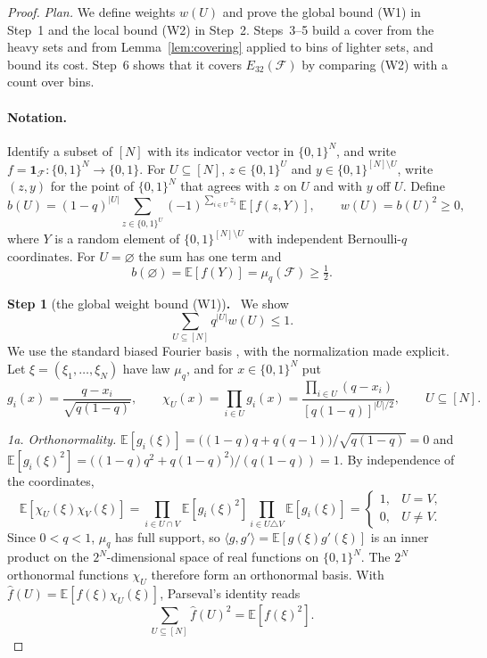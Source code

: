 \documentclass[11pt,letterpaper]{article}
\theoremstyle{definition}
\theoremstyle{remark}
\numberwithin{equation}{section}
\newcommand{\step}[2]{\medskip\noindent\textbf{Step #1} (#2)\textbf{.}\ }
\begin{document}
\begin{proof}
\emph{Plan.} We define weights $w(U)$ and prove the global bound (W1) in
Step~1 and the local bound (W2) in Step~2. Steps~3--5 build a cover from
the heavy sets and from Lemma~\ref{lem:covering} applied to bins of lighter
sets, and bound its cost. Step~6 shows that it covers
$E_{32}(\mathcal F)$ by comparing (W2) with a count over bins.

\paragraph{Notation.}
Identify a subset of $[N]$ with its indicator vector in $\{0,1\}^N$, and
write $f=\mathbf 1_{\mathcal F}:\{0,1\}^N\to\{0,1\}$. For
$U\subseteq[N]$, $z\in\{0,1\}^U$ and $y\in\{0,1\}^{[N]\setminus U}$, write
$(z,y)$ for the point of $\{0,1\}^N$ that agrees with $z$ on $U$ and with
$y$ off $U$. Define
\begin{equation}\label{eq:weights-definition}
 b(U)=(1-q)^{|U|}
 \sum_{z\in\{0,1\}^{U}}(-1)^{\sum_{i\in U}z_i}\,
 \mathbb E[f(z,Y)],
 \qquad w(U)=b(U)^2\ge0,
\end{equation}
where $Y$ is a random element of $\{0,1\}^{[N]\setminus U}$ with
independent Bernoulli-$q$ coordinates. For $U=\varnothing$ the sum has
one term and
\begin{equation}\label{eq:b-empty}
b(\varnothing)=\mathbb E[f(Y)]=\mu_q(\mathcal F)\ge\tfrac12 .
\end{equation}

\step{1}{the global weight bound \textup{(W1)}}
We show
\begin{equation}\label{eq:global-weight-bound}
 \sum_{U\subseteq[N]}q^{|U|}w(U)\le1 .
\end{equation}
We use the standard biased Fourier basis
\cite[Section~8.4]{ODonnell14}, with the normalization made explicit.
Let $\xi=(\xi_1,\ldots,\xi_N)$ have law $\mu_q$, and for $x\in\{0,1\}^N$
put
\[
 g_i(x)=\frac{q-x_i}{\sqrt{q(1-q)}},\qquad
 \chi_U(x)=\prod_{i\in U}g_i(x)
 =\frac{\prod_{i\in U}(q-x_i)}{[q(1-q)]^{|U|/2}},
 \qquad U\subseteq[N].
\]

\emph{1a. Orthonormality.}
$\mathbb E[g_i(\xi)]=\bigl((1-q)q+q(q-1)\bigr)/\sqrt{q(1-q)}=0$ and
$\mathbb E[g_i(\xi)^2]=\bigl((1-q)q^2+q(1-q)^2\bigr)/(q(1-q))=1$.
By independence of the coordinates,
\[
\mathbb E[\chi_U(\xi)\chi_V(\xi)]
=\prod_{i\in U\cap V}\mathbb E[g_i(\xi)^2]
 \prod_{i\in U\triangle V}\mathbb E[g_i(\xi)]
=\begin{cases}1,&U=V,\\0,&U\ne V.\end{cases}
\]
Since $0<q<1$, $\mu_q$ has full support, so
$\langle g,g'\rangle=\mathbb E[g(\xi)g'(\xi)]$ is an inner product on the
$2^N$-dimensional space of real functions on $\{0,1\}^N$. The $2^N$
orthonormal functions $\chi_U$ therefore form an orthonormal basis. With
$\widehat f(U)=\mathbb E[f(\xi)\chi_U(\xi)]$, Parseval's identity reads
\begin{equation}\label{eq:parseval}
\sum_{U\subseteq[N]}\widehat f(U)^2=\mathbb E[f(\xi)^2].
\end{equation}


\end{proof}
\end{document}
